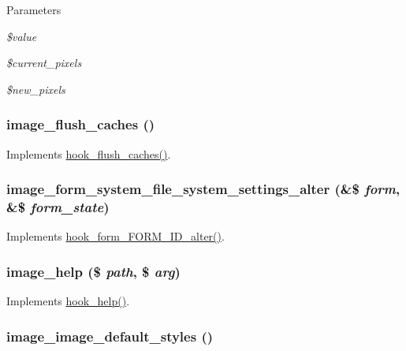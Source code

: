 \begin{DoxyParams}{Parameters}
\item[{\em \$value}]\item[{\em \$current\_\-pixels}]\item[{\em \$new\_\-pixels}]\end{DoxyParams}
\hypertarget{image_8module_a5c9f5b16187ee7050c9f47ffbe204a9b}{
\subsubsection[{image\_\-flush\_\-caches}]{\setlength{\rightskip}{0pt plus 5cm}image\_\-flush\_\-caches ()}}
\label{image_8module_a5c9f5b16187ee7050c9f47ffbe204a9b}
Implements \hyperlink{group__hooks_ga66531e6e564157b7ca45ed07549c9b97}{hook\_\-flush\_\-caches()}. \hypertarget{image_8module_adac7f313632df6ce2a34f3cadb75130c}{
\subsubsection[{image\_\-form\_\-system\_\-file\_\-system\_\-settings\_\-alter}]{\setlength{\rightskip}{0pt plus 5cm}image\_\-form\_\-system\_\-file\_\-system\_\-settings\_\-alter (\&\$ {\em form}, \/  \&\$ {\em form\_\-state})}}
\label{image_8module_adac7f313632df6ce2a34f3cadb75130c}
Implements \hyperlink{group__hooks_ga8d4a4089551493d55911bd5c4f218264}{hook\_\-form\_\-FORM\_\-ID\_\-alter()}. \hypertarget{image_8module_a777780a89a7149f7ee61107cc6ec4d98}{
\subsubsection[{image\_\-help}]{\setlength{\rightskip}{0pt plus 5cm}image\_\-help (\$ {\em path}, \/  \$ {\em arg})}}
\label{image_8module_a777780a89a7149f7ee61107cc6ec4d98}
Implements \hyperlink{group__hooks_ga5589c2714a782738e8851c4c90231f0e}{hook\_\-help()}. \hypertarget{image_8module_ac412aad2549572b4f2dae20d2dbd89ae}{
\subsubsection[{image\_\-image\_\-default\_\-styles}]{\setlength{\rightskip}{0pt plus 5cm}image\_\-image\_\-default\_\-styles ()}}
